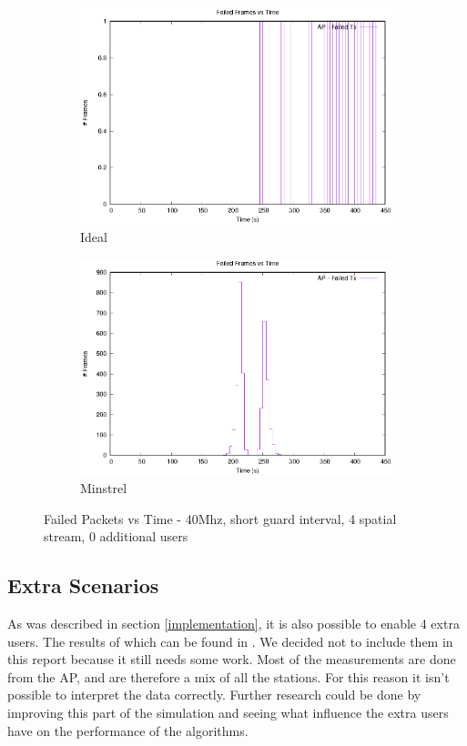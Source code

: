\documentclass[12]{article}
\begin{document}
\begin{figure}[!htb]
\begin{subfigure}{.5\textwidth}
  \centering
  \includegraphics[width=\linewidth]{"40Mhz_Short_4SS_0AU/Ideal/FailedPackets"}
  \caption{Ideal}
  \label{fig:40_id_fpt}
\end{subfigure}%
\begin{subfigure}{.5\textwidth}
  \includegraphics[width=\linewidth]{"40Mhz_Short_4SS_0AU/MinstrelHt/FailedPackets"}
  \caption{Minstrel}
  \label{fig:40_mi_fpt}
\end{subfigure}%
\caption{Failed Packets vs Time - 40Mhz, short guard interval, 4 spatial stream, 0 additional users}
\label{fig:40_fpt}
\end{figure}

\subsection{Extra Scenarios}
As was described in section \ref{implementation}, it is also possible to enable 4 extra users. The results of which can be found in \citep{github}. We decided not to include them in this report because it still needs some work. Most of the measurements are done from the AP, and are therefore a mix of all the stations. For this reason it isn't possible to interpret the data correctly. Further research could be done by improving this part of the simulation and seeing what influence the extra users have on the performance of the algorithms.\\
\end{document}
